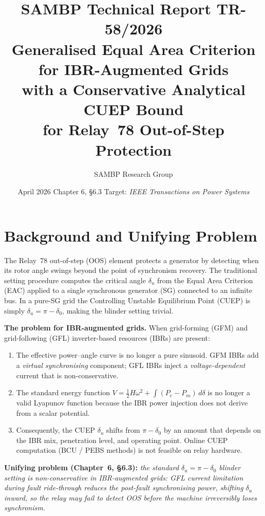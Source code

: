 \documentclass[11pt,a4paper]{article}
\title{%
  \textbf{\textsf{\color{sambpblue}SAMBP Technical Report TR-58/2026}}\\[6pt]
  \Large Generalised Equal Area Criterion for IBR-Augmented Grids\\[4pt]
  \large with a Conservative Analytical CUEP Bound\\
  for Relay~78 Out-of-Step Protection%
}
\author{SAMBP Research Group}
\date{April 2026 \quad\textbar\quad Chapter 6, \S6.3 \quad\textbar\quad
      Target: \emph{IEEE Transactions on Power Systems}}
\newcommand{\dz}{\delta_0}         %
\newcommand{\du}{\delta_u}         %
\newcommand{\Pm}{P_m}
\begin{document}
\maketitle
\thispagestyle{empty}
\tableofcontents
\clearpage

\section{Background and Unifying Problem}
\label{sec:background}

The Relay~78 out-of-step (OOS) element protects a generator by detecting when
its rotor angle swings beyond the point of synchronism recovery.  The
traditional setting procedure computes the critical angle $\du$ from the
Equal Area Criterion (EAC) applied to a single synchronous generator (SG)
connected to an infinite bus.  In a pure-SG grid the Controlling Unstable
Equilibrium Point (CUEP) is simply $\du = \pi - \dz$, making the blinder
setting trivial.

\textbf{The problem for IBR-augmented grids.}  When grid-forming (GFM) and
grid-following (GFL) inverter-based resources (IBRs) are present:

\begin{enumerate}
  \item The effective power--angle curve is no longer a pure sinusoid.  GFM
        IBRs add a \emph{virtual synchronising} component; GFL IBRs
        inject a \emph{voltage-dependent} current that is non-conservative.
  \item The standard energy function $V = \tfrac{1}{2}H\omega^2 +
        \int(P_e - \Pm)\,d\delta$ is no longer a valid Lyapunov function
        because the IBR power injection does not derive from a scalar
        potential.
  \item Consequently, the CUEP $\du$ shifts from $\pi - \dz$ by an amount
        that depends on the IBR mix, penetration level, and operating point.
        Online CUEP computation (BCU / PEBS methods) is not feasible on
        relay hardware.
\end{enumerate}

\textbf{Unifying problem (Chapter~6, \S6.3):} \emph{the standard
$\du = \pi - \dz$ blinder setting is non-conservative in IBR-augmented grids:
GFL current limitation during fault ride-through reduces the post-fault
synchronising power, shifting $\du$ inward, so the relay may fail to detect
OOS before the machine irreversibly loses synchronism.}
\end{document}
